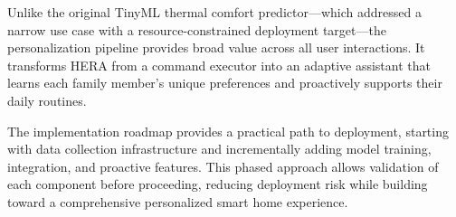 Unlike the original TinyML thermal comfort predictor—which addressed a
narrow use case with a resource-constrained deployment target—the
personalization pipeline provides broad value across all user
interactions. It transforms HERA from a command executor into an adaptive
assistant that learns each family member's unique preferences and proactively
supports their daily routines.

The implementation roadmap provides a practical path to deployment,
starting with data collection infrastructure and incrementally adding
model training, integration, and proactive features. This phased approach
allows validation of each component before proceeding, reducing deployment
risk while building toward a comprehensive personalized smart home
experience.
